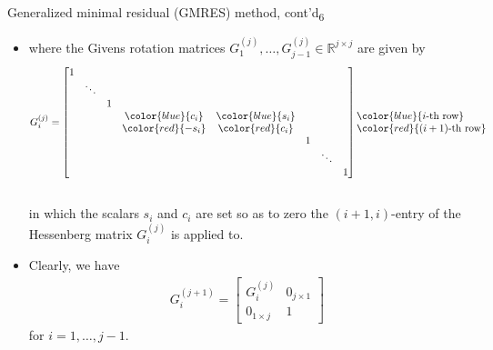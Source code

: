 \documentclass[t,usepdftitle=false]{beamer}
\begin{document}
\begin{frame}{Generalized minimal residual (GMRES) method, cont'd\textsubscript{6}}
\begin{itemize}
\item[]where the Givens rotation matrices $G^{(j)}_1,\dots,G^{(j)}_{j-1}\in\mathbb{R}^{j\times j}$ are given by
{\small
\begin{align*}
G_i^{(j)}=
\begin{bmatrix}
1&&&&&&&\\
&\ddots&&&&&&\\
&&1&&&&&\\
&&&{\color{blue}{c_i}}&{\color{blue}{s_i}}&&&\\
&&&{\color{red}{-s_i}}&{\color{red}{c_i}}&&&\\
&&&&&1&&\\
&&&&&&\ddots&\\
&&&&&&&1\\
\end{bmatrix}
\begin{matrix}
{\color{blue}{i\text{-th row}}}\hfill\\
{\color{red}{(i+1)\text{-th row}}}\hfill
\end{matrix}
\end{align*}}\\
in which the scalars $s_i$ and $c_i$ are set so as to zero the $(i+1,i)$-entry of the Hessenberg matrix $G_i^{(j)}$ is applied to.
\item[] Clearly, we have 
\begin{align*}
G^{(j+1)}_i=
\begin{bmatrix}
G^{(j)}_i&0_{j\times 1}\\
0_{1\times j}&1
\end{bmatrix}
\end{align*}
for $i=1,\dots,j-1$.
\end{itemize}
\end{frame}
\end{document}
